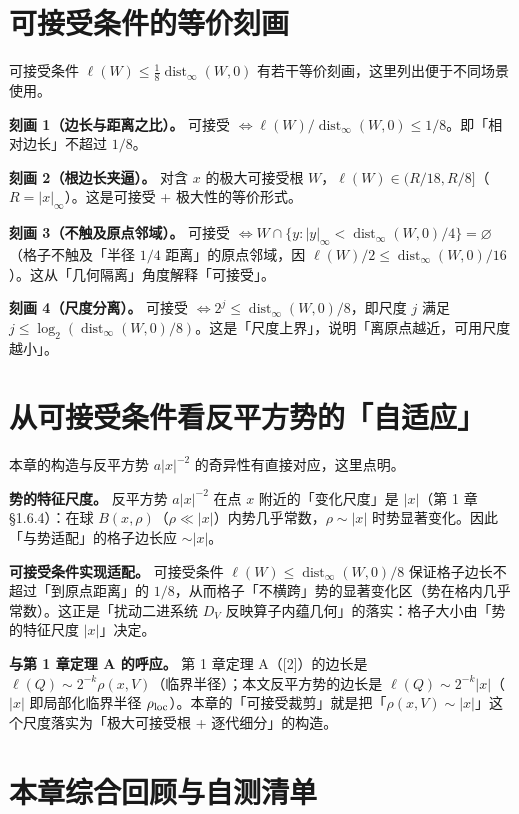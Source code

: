 \documentclass[a4paper,11pt,openany]{ctexbook}
\numberwithin{equation}{chapter}
\numberwithin{figure}{chapter}
\numberwithin{table}{chapter}
\begin{document}
\section{可接受条件的等价刻画}

可接受条件 $\ell(W)\le\frac18\operatorname{dist}_\infty(W,0)$ 有若干等价刻画，这里列出便于不同场景使用。

\textbf{刻画 1（边长与距离之比）。} 可接受 $\iff \ell(W)/\operatorname{dist}_\infty(W,0)\le1/8$。即「相对边长」不超过 $1/8$。

\textbf{刻画 2（根边长夹逼）。} 对含 $x$ 的极大可接受根 $W$，$\ell(W)\in(R/18,R/8]$（$R=|x|_\infty$）。这是可接受 + 极大性的等价形式。

\textbf{刻画 3（不触及原点邻域）。} 可接受 $\iff W\cap\{y:|y|_\infty<\operatorname{dist}_\infty(W,0)/4\}=\varnothing$（格子不触及「半径 $1/4$ 距离」的原点邻域，因 $\ell(W)/2\le\operatorname{dist}_\infty(W,0)/16$）。这从「几何隔离」角度解释「可接受」。

\textbf{刻画 4（尺度分离）。} 可接受 $\iff 2^j\le\operatorname{dist}_\infty(W,0)/8$，即尺度 $j$ 满足 $j\le\log_2(\operatorname{dist}_\infty(W,0)/8)$。这是「尺度上界」，说明「离原点越近，可用尺度越小」。

\section{从可接受条件看反平方势的「自适应」}

本章的构造与反平方势 $a|x|^{-2}$ 的奇异性有直接对应，这里点明。

\textbf{势的特征尺度。} 反平方势 $a|x|^{-2}$ 在点 $x$ 附近的「变化尺度」是 $|x|$（第 1 章 §1.6.4）：在球 $B(x,\rho)$（$\rho\ll|x|$）内势几乎常数，$\rho\sim|x|$ 时势显著变化。因此「与势适配」的格子边长应 $\sim|x|$。

\textbf{可接受条件实现适配。} 可接受条件 $\ell(W)\le\operatorname{dist}_\infty(W,0)/8$ 保证格子边长不超过「到原点距离」的 $1/8$，从而格子「不横跨」势的显著变化区（势在格内几乎常数）。这正是「扰动二进系统 $D_V$ 反映算子内蕴几何」的落实：格子大小由「势的特征尺度 $|x|$」决定。

\textbf{与第 1 章定理 A 的呼应。} 第 1 章定理 A（[2]）的边长是 $\ell(Q)\sim2^{-k}\rho(x,V)$（临界半径）；本文反平方势的边长是 $\ell(Q)\sim2^{-k}|x|$（$|x|$ 即局部化临界半径 $\rho_{\rm loc}$）。本章的「可接受裁剪」就是把「$\rho(x,V)\sim|x|$」这个尺度落实为「极大可接受根 + 逐代细分」的构造。

\section{本章综合回顾与自测清单}
\end{document}

